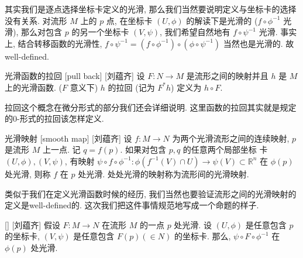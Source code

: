 \documentclass[UTF8]{ctexart}
\begin{document}
        \begin{rmk}
            []
            其实我们是逐点选择坐标卡定义的光滑, 那么我们当然要说明定义与坐标卡的选择没有关系. 对流形 \(M\) 上的 \(p\) 点, 在坐标卡 \((U,\phi)\) 的解读下是光滑的 (\(f \circ \phi^{-1}\) 光滑), 那么对包含 \(p\) 的另一个坐标卡 \((V,\psi)\), 我们希望自然地有 \(f \circ \psi^{-1}\) 光滑. 事实上, 结合转移函数的光滑性,  \(f \circ \psi^{-1} = (f \circ \phi^{-1}) \circ (\phi \circ \psi^{-1})\) 当然也是光滑的. 故well-defined. 
        \end{rmk}

        \begin{dfn}
            []
            {光滑函数的拉回}
            [pull back]
            [刘蕴齐]
            设 \(F:N \to M\) 是流形之间的映射并且 \(h\) 是 \(M\) 上的光滑函数. (\(F\) 意义下) \(h\) 的拉回 (记为 \(F^{*}h\)) 定义为 \(h \circ F\). 
        \end{dfn}

        \begin{rmk}
            []
            拉回这个概念在微分形式的部分我们还会详细说明. 这里函数的拉回其实就是规定的0-形式的拉回该怎样定义. 
        \end{rmk}

        \vspace{10pt}
        
        \begin{dfn}
            []
            {光滑映射}
            [smooth map]
            [刘蕴齐]
            设 \(f:M \to N \) 为两个光滑流形之间的连续映射,
             \(p\) 是流形 \(M\) 上一点. 记  \(q = f(p)\). 
            如果对包含 \(p,q\) 的任意两个局部坐标
            卡 \((U,\phi),(V,\psi)\),
            有映射 \( \psi \circ f \circ \phi^{-1}: \phi(f^{-1}(V) \cap U) \to \psi(V) \subset \mathbb{R}^n \)  在 \(\phi(p)\) 处光滑, 则称  \(f\)  在 \(p\) 处光滑. 
            处处光滑的映射称为流形间的光滑映射. 
        \end{dfn}

        类似于我们在定义光滑函数时候的经历, 我们当然也要验证流形之间的光滑映射的定义是well-defined的. 这次我们把这件事情规范地写成一个命题的样子. 

        \begin{ppt}
            []
            {}
            []
            [刘蕴齐]
            假设  \(F: M \to N \)  在流形 \(M\) 的一点 \(p\) 处光滑. 设  \((U, \phi)\)  是任意包含 \(p\) 的坐标卡,  \((V, \psi)\) 是任意包含 \(F(p)(\in N)\) 的坐标卡.  那么,  \( \psi \circ F \circ \phi^{-1} \) 在 \(\phi(p)\) 处光滑. 
        \end{ppt}
        
\end{document}
